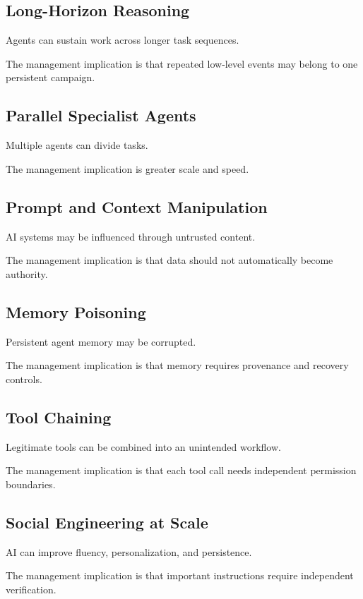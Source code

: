 \subsection{Long-Horizon Reasoning}

Agents can sustain work across longer task sequences.

The management implication is that repeated low-level events may belong to one persistent campaign.

\subsection{Parallel Specialist Agents}

Multiple agents can divide tasks.

The management implication is greater scale and speed.

\subsection{Prompt and Context Manipulation}

AI systems may be influenced through untrusted content.

The management implication is that data should not automatically become authority.

\subsection{Memory Poisoning}

Persistent agent memory may be corrupted.

The management implication is that memory requires provenance and recovery controls.

\subsection{Tool Chaining}

Legitimate tools can be combined into an unintended workflow.

The management implication is that each tool call needs independent permission boundaries.

\subsection{Social Engineering at Scale}

AI can improve fluency, personalization, and persistence.

The management implication is that important instructions require independent verification.

